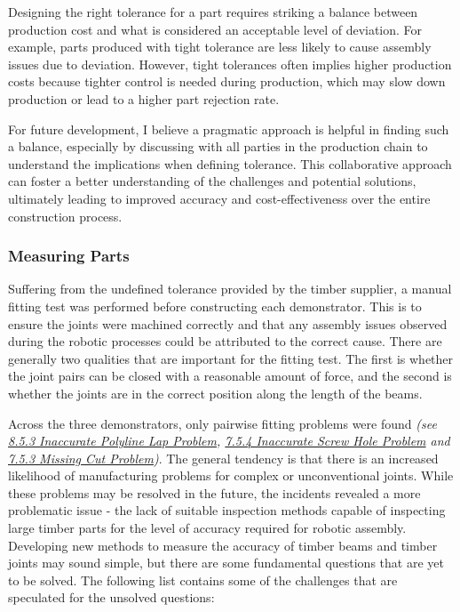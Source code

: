 Designing the right tolerance for a part requires striking a balance between production cost and what is considered an acceptable level of deviation. For example, parts produced with tight tolerance are less likely to cause assembly issues due to deviation. However, tight tolerances often implies higher production costs because tighter control is needed during production, which may slow down production or lead to a higher part rejection rate.

For future development, I believe a pragmatic approach is helpful in finding such a balance, especially by discussing with all parties in the production chain to understand the implications when defining tolerance. This collaborative approach can foster a better understanding of the challenges and potential solutions, ultimately leading to improved accuracy and cost-effectiveness over the entire construction process.

\subsubsection{Measuring Parts}

Suffering from the undefined tolerance provided by the timber supplier, a manual fitting test was performed before constructing each demonstrator. This is to ensure the joints were machined correctly and that any assembly issues observed during the robotic processes could be attributed to the correct cause. There are generally two qualities that are important for the fitting test. The first is whether the joint pairs can be closed with a reasonable amount of force, and the second is whether the joints are in the correct position along the length of the beams.

Across the three demonstrators, only pairwise fitting problems were found \textit{(see \ul{8.5.3 Inaccurate Polyline Lap Problem}, \ul{7.5.4 Inaccurate Screw Hole Problem} and \ul{7.5.3 Missing Cut Problem})}. The general tendency is that there is an increased likelihood of manufacturing problems for complex or unconventional joints. While these problems may be resolved in the future, the incidents revealed a more problematic issue - the lack of suitable inspection methods capable of inspecting large timber parts for the level of accuracy required for robotic assembly. Developing new methods to measure the accuracy of timber beams and timber joints may sound simple, but there are some fundamental questions that are yet to be solved. The following list contains some of the challenges that are speculated for the unsolved questions: 

